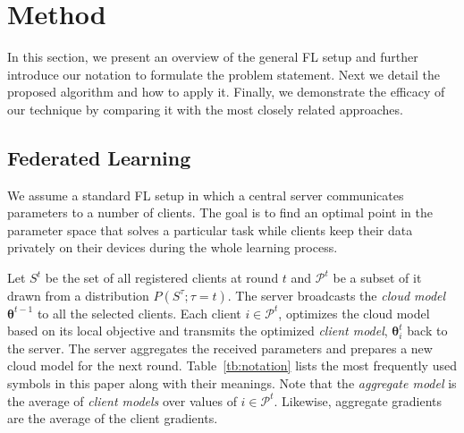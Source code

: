 \documentclass[runningheads]{llncs}
\def\tableref#1{Table~\ref{#1}}
\def\vtheta{{\bm{\theta}}}
\def\gP{{\mathcal{P}}}
\begin{document}
\section{Method}

In this section, we present an overview of the general FL setup and further introduce our notation to formulate the problem statement. Next we detail the proposed algorithm and how to apply it. Finally, we demonstrate the efficacy of our technique by comparing it with the most closely related approaches.


\subsection{Federated Learning}
We assume a standard FL setup in which a central server communicates parameters to a number of clients.
The goal is to find an optimal point in the parameter space that solves a particular task while clients keep their data privately on their devices during the whole learning process. 

Let $S^t$ be the set of all registered clients at round $t$ and $\gP^t$ be a subset of it drawn from a distribution $P(S^{\tau}; \tau=t)$.
The server broadcasts the \emph{cloud model} $\vtheta^{t-1}$ to all the selected clients.
Each client $i \in \gP^t$, optimizes the cloud model based on its local objective and transmits the optimized \emph{client model}, $\vtheta_i^{t}$ back to the server.
The server aggregates the received parameters and prepares a new cloud model for the next round. 
\tableref{tb:notation} lists the most frequently used symbols in this paper along with their meanings. Note that the \emph{aggregate model} is the average of \emph{client models} over values of $i \in \gP^t$.
Likewise, aggregate gradients are the average of the client gradients.
\end{document}

